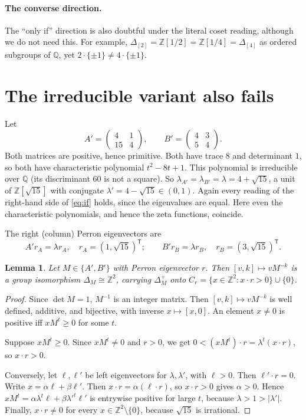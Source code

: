 \documentclass[11pt]{article}
\newtheorem{lemma}[theorem]{Lemma}
\theoremstyle{definition}
\theoremstyle{remark}
\newcommand{\Z}{\mathbb{Z}}
\newcommand{\Q}{\mathbb{Q}}
\begin{document}
\paragraph{The converse direction.} The ``only if'' direction is also doubtful under
the literal coset reading, although we do not need this. For example,
$\Delta_{[2]}=\Z[1/2]=\Z[1/4]=\Delta_{[4]}$ as ordered subgroups of $\Q$, yet
$2\cdot\{\pm1\}\neq4\cdot\{\pm1\}$.

\section{The irreducible variant also fails}\label{sec:irr}
Let
\[
A'=\begin{pmatrix}4&1\\15&4\end{pmatrix},\qquad B'=\begin{pmatrix}4&3\\5&4\end{pmatrix}.
\]
Both matrices are positive, hence primitive. Both have trace $8$ and determinant $1$,
so both have characteristic polynomial $t^2-8t+1$. This polynomial is irreducible
over $\Q$ (its discriminant $60$ is not a square). So
$\lambda_{A'}=\lambda_{B'}=\lambda=4+\sqrt{15}$, a unit of $\Z[\sqrt{15}]$ with
conjugate $\lambda'=4-\sqrt{15}\in(0,1)$. Again every reading of the right-hand
side of \eqref{eq:if} holds, since the eigenvalues are equal. Here even the
characteristic polynomials, and hence the zeta functions, coincide.

The right (column) Perron eigenvectors are
\[
A'r_A=\lambda r_A,\quad r_A=(1,\sqrt{15})^{\mathsf T};\qquad
B'r_B=\lambda r_B,\quad r_B=(3,\sqrt{15})^{\mathsf T}.
\]

\begin{lemma}\label{lem:cone}
Let $M\in\{A',B'\}$ with Perron eigenvector $r$. Then $[v,k]\mapsto vM^{-k}$ is a
group isomorphism $\Delta_M\cong\Z^2$, carrying $\Delta_M^+$ onto
$C_r=\{x\in\Z^2:x\cdot r>0\}\cup\{0\}$.
\end{lemma}
\begin{proof}
Since $\det M=1$, $M^{-1}$ is an integer matrix. Then $[v,k]\mapsto vM^{-k}$ is well
defined, additive, and bijective, with inverse $x\mapsto[x,0]$. An element
$x\ne0$ is positive iff $xM^t\ge0$ for some $t$.

Suppose $xM^t\geq0$. Since $xM^t\neq0$ and $r>0$, we get
$0<(xM^t)\cdot r=\lambda^t(x\cdot r)$, so $x\cdot r>0$.

Conversely, let $\ell,\ell'$ be left eigenvectors for $\lambda,\lambda'$, with
$\ell>0$. Then $\ell'\cdot r=0$. Write $x=\alpha\ell+\beta\ell'$. Then
$x\cdot r=\alpha(\ell\cdot r)$, so $x\cdot r>0$ gives $\alpha>0$. Hence
$xM^t=\alpha\lambda^t\ell+\beta\lambda'^t\ell'$ is entrywise positive for large
$t$, because $\lambda>1>|\lambda'|$. Finally, $x\cdot r\neq0$ for every
$x\in\Z^2\setminus\{0\}$, because $\sqrt{15}$ is irrational.
\end{proof}
\end{document}
